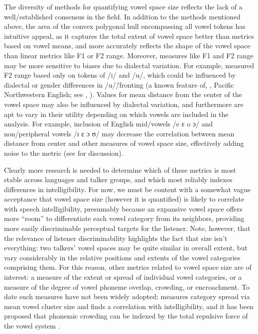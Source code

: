 The diversity of methods for quantifying vowel space size reflects the lack of a well\-/established consensus in the field.  In addition to the methods mentioned above, the area of the convex polygonal hull encompassing all vowel tokens has intuitive appeal, as it captures the total extent of vowel space better than metrics based on vowel means, and more accurately reflects the shape of the vowel space than linear metrics like F1 or F2 range.  Moreover, measures like F1 and F2 range may be more sensitive to biases due to dialectal variation.  For example, \citeauthor*{HazanMarkham2004} measured F2 range based only on tokens of /i/ and /u/, which could be influenced by dialectal or gender differences in /u/\=/fronting (a known feature of, \eg, Pacific Northwestern English; see \citealt{Reed1952}, \citealt[ch. 4]{Ward2003}).  Values for mean distance from the center of the vowel space may also be influenced by dialectal variation, and furthermore are apt to vary in their utility depending on which vowels are included in the analysis.  For example, inclusion of English mid\-/vowels /e ɛ o ɔ/ and non\-/peripheral vowels /ɪ ɛ ɔ ʊ/ may decrease the correlation between mean distance from center and other measures of vowel space size, effectively adding noise to the metric (see \citealt{McCloyEtAl2013} for discussion).  

Clearly more research is needed to determine which of these metrics is most stable across languages and talker groups, and which most reliably indexes differences in intelligibility.  For now, we must be content with a somewhat vague acceptance that vowel space size (however it is quantified) is likely to correlate with speech intelligibility, presumably because an expansive vowel space offers more “room” to differentiate each vowel category from its neighbors, providing more easily discriminable perceptual targets for the listener.  Note, however, that the relevance of listener discriminability highlights the fact that size isn’t everything: two talkers’ vowel spaces may be quite similar in overall extent, but vary considerably in the relative positions and extents of the vowel categories comprising them.  For this reason, other metrics related to vowel space size are of interest: a measure of the extent or spread of individual vowel categories, or a measure of the degree of vowel phoneme overlap, crowding, or encroachment.  To date such measures have not been widely adopted; \citet{McCloyEtAl2013} measures category spread via mean vowel cluster size and finds a correlation with intelligibility, and it has been proposed that phonemic crowding can be indexed by the total repulsive force of the vowel system \citep[see][]{Wright2004a, McCloyEtAl2013}.

